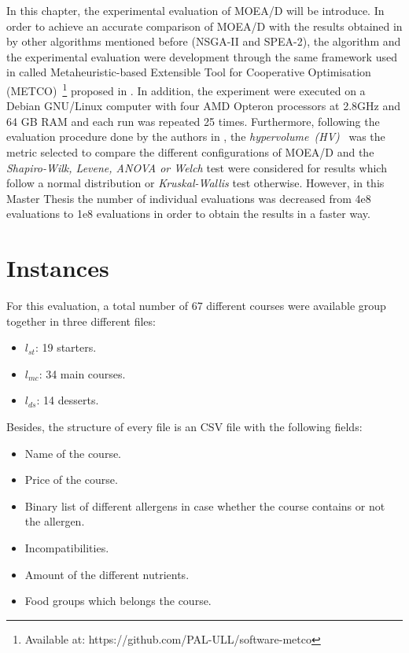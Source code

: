 In this chapter, the experimental evaluation of MOEA/D will be introduce. In order to achieve an accurate comparison of MOEA/D with the results obtained in \cite{Miranda2018} by other algorithms mentioned before (NSGA-II and SPEA-2), the algorithm and the experimental evaluation were development through the same framework used in \cite{Miranda2018} called Metaheuristic-based Extensible Tool for Cooperative Optimisation (METCO)~\footnote{Available at: https://github.com/PAL-ULL/software-metco} proposed in \cite{METCO}.
In addition, the experiment were executed on a Debian GNU/Linux computer with four AMD Opteron processors at 2.8GHz and 64 GB RAM and each run was repeated 25 times.
Furthermore, following the evaluation procedure done by the authors in \cite{Miranda2018}, the \textit{hypervolume~(HV)}~\cite{HYPER} was the metric selected to compare the different configurations of MOEA/D and the \textit{Shapiro-Wilk, Levene, ANOVA or Welch} test were considered for results which follow a normal distribution or \textit{Kruskal-Wallis} test otherwise. However, in this Master Thesis the number of individual evaluations was decreased from 4e8 evaluations to 1e8 evaluations in order to obtain the results in a faster way.
\section{Instances}
For this evaluation, a total number of 67 different courses were available group together in three different files:
\begin{itemize}
    \item $l_{st}$: 19 starters.
    \item $l_{mc}$: 34 main courses.
    \item $l_{ds}$: 14 desserts.
\end{itemize}
Besides, the structure of every file is an CSV file with the following fields:
\begin{itemize}
    \item Name of the course.
    \item Price of the course.
    \item Binary list of different allergens in case whether the course contains or not the allergen.
    \item Incompatibilities.
    \item Amount of the different nutrients.
    \item Food groups which belongs the course.
\end{itemize}
